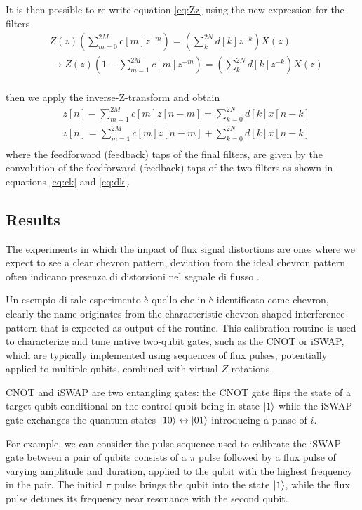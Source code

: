 It is then possible to re-write equation \ref{eq:Zz} using the new expression for the filters
\begin{align}
    & Z(z)\left( \sum_{m=0}^{2M} c[m]z^{-m} \right) = \left( \sum_{k}^{2N} d[k]z^{-k} \right)X(z)\\
    & \rightarrow Z(z)\left(1 - \sum_{m=1}^{2M} c[m]z^{-m} \right) = \left( \sum_{k}^{2N} d[k]z^{-k} \right)X(z)\\ \label{eq:z_final}
\end{align} 

then we apply the inverse-Z-transform and obtain
\begin{align}
    & z[n] - \sum_{m=1}^{2M} c[m]z[n-m] = \sum_{k=0}^{2N} d[k] x[n-k]\\
    & z[n] = \sum_{m=1}^{2M} c[m]z[n-m] + \sum_{k=0}^{2N} d[k] x[n-k]\\
\end{align}
where the feedforward (feedback) taps of the final filters, are given by the convolution of the feedforward (feedback) taps of the two filters as shown in equations \ref{eq:ck} and \ref{eq:dk}.

\subsection{Results}

The experiments in which the impact of flux signal distortions are ones where we expect to see a clear chevron pattern, deviation from the ideal chevron pattern often indicano presenza di distorsioni nel segnale di flusso \cite{Langford2017}.

Un esempio di tale esperimento è quello che in \Qibocal è identificato come chevron, clearly the name originates from the characteristic chevron-shaped interference pattern that is expected as output of the routine.
This calibration routine is used to characterize and tune native two-qubit gates, such as the CNOT or iSWAP, which are typically implemented using sequences of flux pulses, potentially applied to multiple qubits, combined with virtual $Z$-rotations.

CNOT and iSWAP are two entangling gates: the CNOT gate flips the state of a target qubit conditional on the control qubit being in state $\ket{1}$ while the iSWAP gate exchanges the quantum states $\ket{10}\leftrightarrow\ket{01}$ introducing a phase of $i$.

For example, we can consider the pulse sequence used to calibrate the iSWAP gate between a pair of qubits consists of a $\pi$ pulse followed by a flux pulse of varying amplitude and duration, applied to the qubit with the highest frequency in the pair. 
The initial $\pi$ pulse brings the qubit into the state $\ket{1}$, while the flux pulse detunes its frequency near resonance with the second qubit. 

